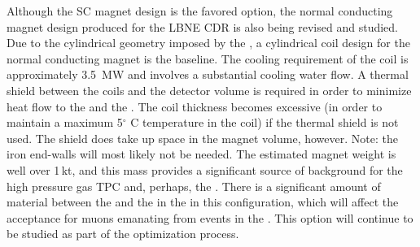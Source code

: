 Although the SC magnet design is the favored option, the normal conducting magnet design produced for the LBNE CDR is also being revised and studied.  Due to the cylindrical geometry imposed by the , a cylindrical coil design for the normal conducting magnet is the baseline. The cooling requirement of the coil is approximately \SI{3.5}{MW} and involves a substantial cooling water flow. A thermal shield between the coils and the detector volume is required in order to minimize heat flow to the  and the . The coil thickness becomes excessive (in order to maintain a maximum 5$^\circ$ C temperature in the coil) if the thermal shield is not used.  The shield does take up space in the magnet volume, however.  %
Note: the iron end-walls will most likely not be needed. The estimated magnet weight is well over 1\,kt, and this mass provides a significant source of background for the high pressure gas TPC and, perhaps, the  .  There is a significant amount of material between the  and the  in the  in this configuration, which will affect the acceptance for muons emanating from events in the  . This option will continue to be studied as part of the optimization process.
%
%

    
